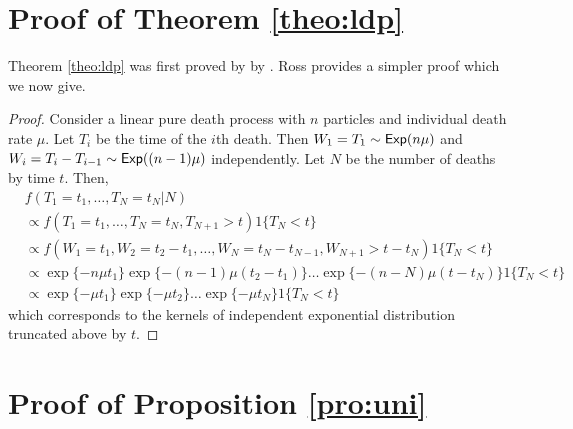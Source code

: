 \documentclass[11pt]{article}
\newcommand{\ram}[1]{{\color{green}{ #1}}}
\begin{document}
	\ram{modelling the infection rate over time seems necessary for Ebola data.}
	
	\appendix
	
	\section{Proof of Theorem \ref{theo:ldp}}
	\label{app:ldp}
	
	Theorem \ref{theo:ldp} was first proved by by \cite{Neuts.1971}. Ross \ram{ref} provides a simpler proof which we now give.
	
	\begin{proof}
	Consider a linear pure death process with $n$ particles and individual death rate $\mu$.
	Let $T_i$ be the time of the $i$th death. Then $W_1 = T_1 \sim \textsf{Exp}(n\mu)$ and $W_i = T_i - T_{i-1} \sim \textsf{Exp}((n-1)\mu)$ independently. Let $N$ be the number of deaths by time $t$. Then, 
	\begin{align*}
		& f(T_1 = t_1, \dots, T_N = t_N | N) \\
		& \propto f(T_1 = t_1, \dots, T_N = t_N, T_{N+1} > t) 1\{T_N < t\}\\
		& \propto f(W_1 = t_1, W_2 = t_2 - t_1, \dots, W_N = t_N - t_{N-1}, W_{N+1} > t - t_N) 1\{T_N < t\}\\
		& \propto \exp\{-n\mu t_1\} \exp\{-(n-1)\mu(t_2-t_1)\}\dots \exp\{-(n-N)\mu(t - t_N)\} 1\{T_N < t\}\\
		& \propto \exp\{-\mu t_1\}\exp\{-\mu t_2\} \dots \exp\{-\mu t_N\} 1\{T_N < t\}
	\end{align*}
	which corresponds to the kernels of independent exponential distribution truncated above by $t$.
	
	\end{proof}
	
	\section{Proof of Proposition \ref{pro:uni}}
	\label{app:uni}
	
\end{document}
